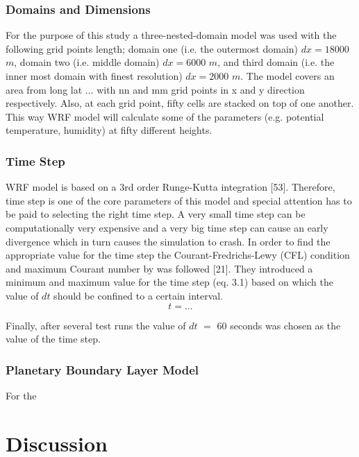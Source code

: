 \documentclass[a4paper,12pt]{article}
\numberwithin{equation}{section} %
\begin{document}
\subsubsection{Domains and Dimensions}
For the purpose of this study a three-nested-domain model was used with the following grid points length; domain one (i.e. the outermost domain) $dx = 18000$ $m$, domain two (i.e. middle domain) $dx = 6000$ $m$, and third domain (i.e. the inner most domain with finest resolution) $dx = 2000$ $m$. The model covers an area from long lat ... with nn and mm grid points in x and y direction respectively. Also, at each grid point, fifty cells are stacked on top of one another. This way WRF model will calculate some of the parameters (e.g. potential temperature, humidity) at fifty different heights.

\subsubsection{Time Step}
WRF model is based on a 3rd order Runge-Kutta integration [53]. Therefore, time step is one of the core parameters of this model and special attention has to be paid to selecting the right time step. A very small time step can be computationally very expensive and a very big time step can cause an early divergence which in turn causes the simulation to crash. In order to find the appropriate value for the time step the Courant-Fredrichs-Lewy (CFL) condition and maximum Courant number by  was followed [21]. They introduced a minimum and maximum value for the time step (eq. 3.1) based on which the value of $dt$ should be confined to a certain interval.
\vspace{0.25cm}
\begin{equation}
t = ...
\end{equation}

\vspace{0.25cm}

Finally, after several test runs the value of $dt$ $=$ $60$ seconds was chosen as the value of the time step.

\subsubsection{Planetary Boundary Layer Model}

For the 

\newpage

\section{Discussion}
\end{document}
